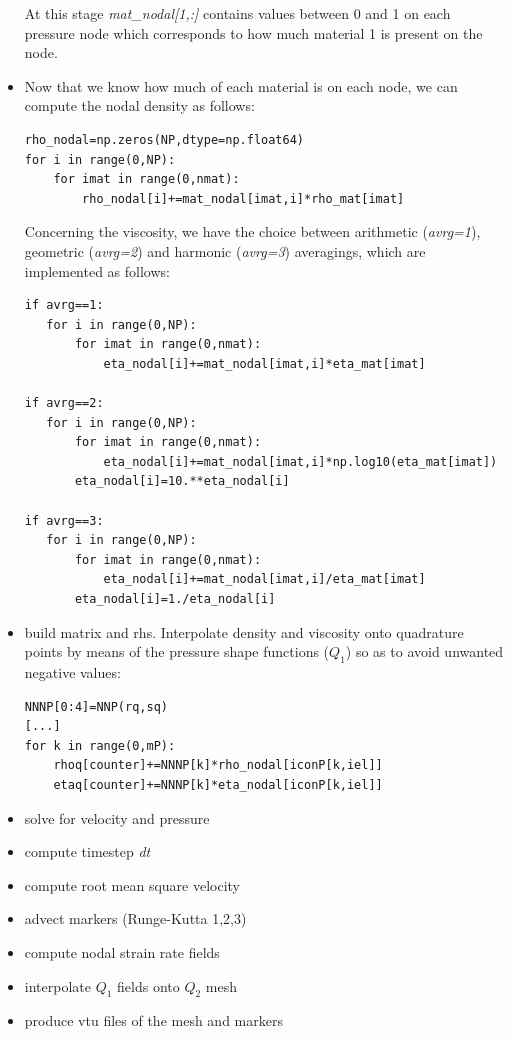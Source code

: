 \begin{itemize}
At this stage {\sl mat\_nodal[1,:]} contains values between 0 and 1 on each pressure node which corresponds to 
how much material 1 is present on the node. 

\item Now that we know how much of each material is on each node, we can compute the nodal density as follows:

\begin{lstlisting}
rho_nodal=np.zeros(NP,dtype=np.float64)
for i in range(0,NP):
    for imat in range(0,nmat):
        rho_nodal[i]+=mat_nodal[imat,i]*rho_mat[imat]
\end{lstlisting}

Concerning the viscosity, we have the choice between arithmetic ({\sl avrg=1}), geometric ({\sl avrg=2}) and 
harmonic ({\sl avrg=3}) averagings, which are implemented as follows:

\begin{lstlisting}
if avrg==1:
   for i in range(0,NP):
       for imat in range(0,nmat):
           eta_nodal[i]+=mat_nodal[imat,i]*eta_mat[imat]

if avrg==2:
   for i in range(0,NP):
       for imat in range(0,nmat):
           eta_nodal[i]+=mat_nodal[imat,i]*np.log10(eta_mat[imat])
       eta_nodal[i]=10.**eta_nodal[i]

if avrg==3:
   for i in range(0,NP):
       for imat in range(0,nmat):
           eta_nodal[i]+=mat_nodal[imat,i]/eta_mat[imat]
       eta_nodal[i]=1./eta_nodal[i]
\end{lstlisting}

\item build matrix and rhs. Interpolate density and viscosity onto quadrature points by means of the pressure 
shape functions ($Q_1$) so as to avoid unwanted negative values:

\begin{lstlisting}
NNNP[0:4]=NNP(rq,sq)
[...]
for k in range(0,mP):
    rhoq[counter]+=NNNP[k]*rho_nodal[iconP[k,iel]]
    etaq[counter]+=NNNP[k]*eta_nodal[iconP[k,iel]]
\end{lstlisting}

\item solve for velocity and pressure
\item compute timestep {\sl dt}
\item compute root mean square velocity
\item advect markers (Runge-Kutta 1,2,3)
\item compute nodal strain rate fields
\item interpolate $Q_1$ fields onto $Q_2$ mesh
\item produce vtu files of the mesh and markers
\end{itemize}



